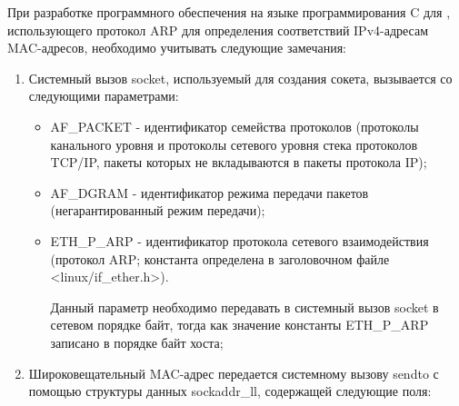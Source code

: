 
	При разработке программного обеспечения на языке программирования C для \linux, использующего протокол ARP для определения соответствий IPv4-адресам
	MAC-адресов, необходимо учитывать следующие замечания:

	\begin{enumerate}

		\item Системный вызов socket, используемый для создания сокета, вызывается со следующими параметрами:

			\begin{itemize}

				\item AF\_PACKET - идентификатор семейства протоколов (протоколы канального уровня и протоколы сетевого уровня стека протоколов TCP/IP,
				пакеты которых не вкладываются в пакеты протокола IP);
				\item AF\_DGRAM - идентификатор режима передачи пакетов (негарантированный режим передачи);
				\item ETH\_P\_ARP - идентификатор протокола сетевого взаимодействия (протокол ARP; константа определена в заголовочном файле
				<linux/if\_ether.h>).

				Данный параметр необходимо передавать в системный вызов socket в сетевом порядке байт, тогда как значение константы ETH\_P\_ARP записано в порядке
				байт хоста;

			\end{itemize}

		\item Широковещательный MAC-адрес передается системному вызову sendto с помощью структуры данных sockaddr\_ll, содержащей следующие поля:

			\begin{itemize}
				

\end{itemize}
\end{enumerate}
